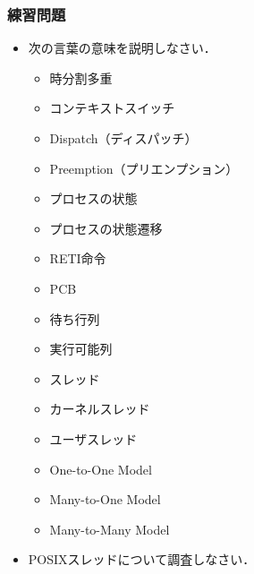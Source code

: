 \documentclass[unicode,handout]{beamer}                   %
\begin{document}
\begin{frame}[fragile]
  \frametitle{練習問題}
  \begin{itemize}
  \item 次の言葉の意味を説明しなさい．
    \begin{itemize}
    \item 時分割多重
    \item コンテキストスイッチ
    \item Dispatch（ディスパッチ）
    \item Preemption（プリエンプション）
    \item プロセスの状態
    \item プロセスの状態遷移
    \item RETI命令
    \item PCB
    \item 待ち行列
    \item 実行可能列
    \item スレッド
    \item カーネルスレッド
    \item ユーザスレッド
    \item One-to-One Model
    \item Many-to-One Model
    \item Many-to-Many Model
    \end{itemize}
  \item POSIXスレッドについて調査しなさい．
  \end{itemize}
\end{frame}
\end{document}
